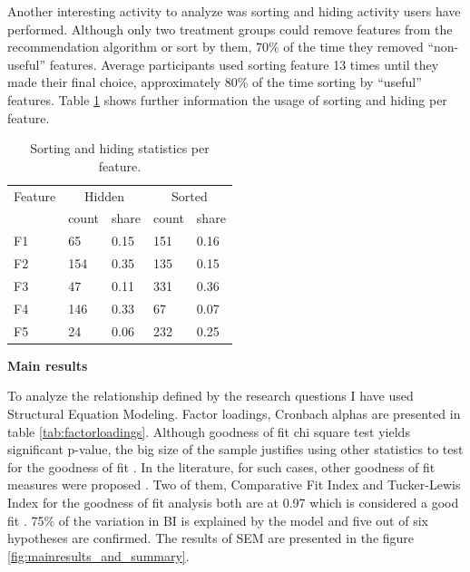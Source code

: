\documentclass[a4paper,12pt]{article}
\begin{document}
Another interesting activity to analyze was sorting and hiding activity users have performed. Although only two treatment groups could remove features from the recommendation algorithm or sort by them, 70\% of the time they removed ``non-useful'' features. Average participants used sorting feature 13 times until they made their final choice, approximately 80\% of the time sorting by ``useful'' features. Table  \ref{tab:eventsperfeature} shows further information the usage of sorting and hiding per feature.

\begin{table}[!ht]
    \centering
    \begin{tabular}{lllll}
    \toprule
        Feature & \multicolumn{2}{c}{Hidden} & \multicolumn{2}{c}{Sorted} \\ \cmidrule(lr){2-3} \cmidrule(lr){4-5}
        & count & share & count & share \\ \midrule
        F1 & 65 & 0.15 & 151 & 0.16 \\
        F2 & 154 & 0.35 & 135 & 0.15 \\
        F3 & 47 & 0.11 & 331 & 0.36 \\
        F4 & 146 & 0.33 & 67 & 0.07 \\
        F5 & 24 & 0.06 & 232 & 0.25 \\ \bottomrule
    \end{tabular}
    \caption{Sorting and hiding statistics per feature.}
    \label{tab:eventsperfeature}
\end{table}

\textbf{Main results}

To analyze the relationship defined by the research questions I have used Structural Equation Modeling. Factor loadings, Cronbach alphas are presented in table \ref{tab:factorloadings}. Although goodness of fit chi square test yields significant p-value, the big size of the sample justifies using other statistics to test for the goodness of fit \citep{schermelleh2003evaluating}. In the literature, for such cases, other goodness of fit measures were proposed \citep{schreiber2006reporting}. Two of them, Comparative Fit Index and Tucker-Lewis Index for the goodness of fit analysis both are at 0.97 which is considered a good fit \citep{schumacker2004beginner}. 75\% of the variation in BI is explained by the model and five out of six hypotheses are confirmed. The results of SEM are presented in the figure \ref{fig:mainresults_and_summary}. 
\end{document}
